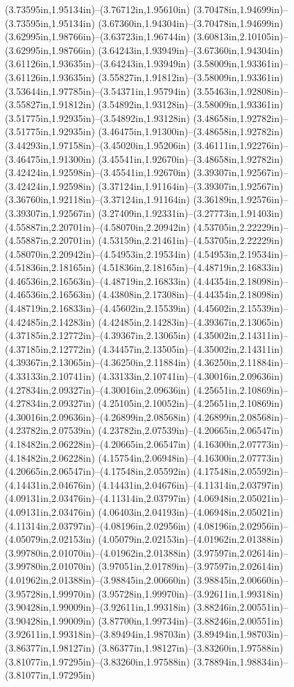 (3.73595in,1.95134in)--(3.76712in,1.95610in) (3.70478in,1.94699in)--(3.73595in,1.95134in) (3.67360in,1.94304in)--(3.70478in,1.94699in) (3.62995in,1.98766in)--(3.63723in,1.96744in) (3.60813in,2.10105in)--(3.62995in,1.98766in) (3.64243in,1.93949in)--(3.67360in,1.94304in) (3.61126in,1.93635in)--(3.64243in,1.93949in) (3.58009in,1.93361in)--(3.61126in,1.93635in) (3.55827in,1.91812in)--(3.58009in,1.93361in) (3.53644in,1.97785in)--(3.54371in,1.95794in) (3.55463in,1.92808in)--(3.55827in,1.91812in) (3.54892in,1.93128in)--(3.58009in,1.93361in) (3.51775in,1.92935in)--(3.54892in,1.93128in) (3.48658in,1.92782in)--(3.51775in,1.92935in) (3.46475in,1.91300in)--(3.48658in,1.92782in) (3.44293in,1.97158in)--(3.45020in,1.95206in) (3.46111in,1.92276in)--(3.46475in,1.91300in) (3.45541in,1.92670in)--(3.48658in,1.92782in) (3.42424in,1.92598in)--(3.45541in,1.92670in) (3.39307in,1.92567in)--(3.42424in,1.92598in) (3.37124in,1.91164in)--(3.39307in,1.92567in) (3.36760in,1.92118in)--(3.37124in,1.91164in) (3.36189in,1.92576in)--(3.39307in,1.92567in) (3.27409in,1.92331in)--(3.27773in,1.91403in) (4.55887in,2.20701in)--(4.58070in,2.20942in) (4.53705in,2.22229in)--(4.55887in,2.20701in) (4.53159in,2.21461in)--(4.53705in,2.22229in) (4.58070in,2.20942in)--(4.54953in,2.19534in) (4.54953in,2.19534in)--(4.51836in,2.18165in) (4.51836in,2.18165in)--(4.48719in,2.16833in) (4.46536in,2.16563in)--(4.48719in,2.16833in) (4.44354in,2.18098in)--(4.46536in,2.16563in) (4.43808in,2.17308in)--(4.44354in,2.18098in) (4.48719in,2.16833in)--(4.45602in,2.15539in) (4.45602in,2.15539in)--(4.42485in,2.14283in) (4.42485in,2.14283in)--(4.39367in,2.13065in) (4.37185in,2.12772in)--(4.39367in,2.13065in) (4.35002in,2.14311in)--(4.37185in,2.12772in) (4.34457in,2.13505in)--(4.35002in,2.14311in) (4.39367in,2.13065in)--(4.36250in,2.11884in) (4.36250in,2.11884in)--(4.33133in,2.10741in) (4.33133in,2.10741in)--(4.30016in,2.09636in) (4.27834in,2.09327in)--(4.30016in,2.09636in) (4.25651in,2.10869in)--(4.27834in,2.09327in) (4.25105in,2.10052in)--(4.25651in,2.10869in) (4.30016in,2.09636in)--(4.26899in,2.08568in) (4.26899in,2.08568in)--(4.23782in,2.07539in) (4.23782in,2.07539in)--(4.20665in,2.06547in) (4.18482in,2.06228in)--(4.20665in,2.06547in) (4.16300in,2.07773in)--(4.18482in,2.06228in) (4.15754in,2.06948in)--(4.16300in,2.07773in) (4.20665in,2.06547in)--(4.17548in,2.05592in) (4.17548in,2.05592in)--(4.14431in,2.04676in) (4.14431in,2.04676in)--(4.11314in,2.03797in) (4.09131in,2.03476in)--(4.11314in,2.03797in) (4.06948in,2.05021in)--(4.09131in,2.03476in) (4.06403in,2.04193in)--(4.06948in,2.05021in) (4.11314in,2.03797in)--(4.08196in,2.02956in) (4.08196in,2.02956in)--(4.05079in,2.02153in) (4.05079in,2.02153in)--(4.01962in,2.01388in) (3.99780in,2.01070in)--(4.01962in,2.01388in) (3.97597in,2.02614in)--(3.99780in,2.01070in) (3.97051in,2.01789in)--(3.97597in,2.02614in) (4.01962in,2.01388in)--(3.98845in,2.00660in) (3.98845in,2.00660in)--(3.95728in,1.99970in) (3.95728in,1.99970in)--(3.92611in,1.99318in) (3.90428in,1.99009in)--(3.92611in,1.99318in) (3.88246in,2.00551in)--(3.90428in,1.99009in) (3.87700in,1.99734in)--(3.88246in,2.00551in) (3.92611in,1.99318in)--(3.89494in,1.98703in) (3.89494in,1.98703in)--(3.86377in,1.98127in) (3.86377in,1.98127in)--(3.83260in,1.97588in) (3.81077in,1.97295in)--(3.83260in,1.97588in) (3.78894in,1.98834in)--(3.81077in,1.97295in) 